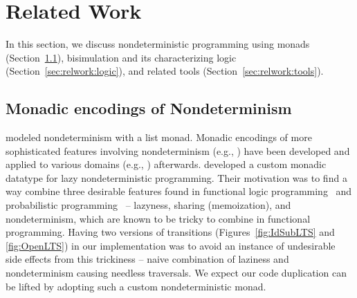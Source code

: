 \section{Related Work}
\label{sec:relwork}
In this section, we discuss 
nondeterministic programming using monads (Section~\ref{sec:relwork:monad}),
bisimulation and its characterizing logic (Section~\ref{sec:relwork:logic}),
and related tools (Section~\ref{sec:relwork:tools}).
\vspace*{-1ex}
\subsection{Monadic encodings of Nondeterminism}
\label{sec:relwork:monad}
\citet{Wadler85listm} modeled nondeterminism with a list monad.
Monadic encodings of more sophisticated features involving nondeterminism
(e.g., \cite{FisOleSha09,Hinze00bmt,KisShaFriSab05logict}) have been developed
and applied to various domains (e.g., \cite{ChaGuoKohLoc98,Schrijvers09mcp}) afterwards.
\citet{FisOleSha09} developed a custom monadic datatype for lazy nondeterministic programming.
Their motivation was to find a way combine three desirable features found in
functional logic programming~\cite{Hanus10lea,LopHer99toy,TolSerNit04} and
probabilistic programming~\cite{ErwKol06pfp,Kiselyov16hakaru10}
-- lazyness, sharing (memoization), and nondeterminism, which are known to be tricky
to combine in functional programming. Having two versions of transitions
(Figures~\ref{fig:IdSubLTS} and \ref{fig:OpenLTS}) in our implementation
was to avoid an instance of undesirable side effects from this trickiness --
naive combination of laziness and nondeterminism causing needless traversals.
We expect our code duplication can be lifted by adopting
such a custom nondeterministic monad.%
\vspace*{-1ex}
